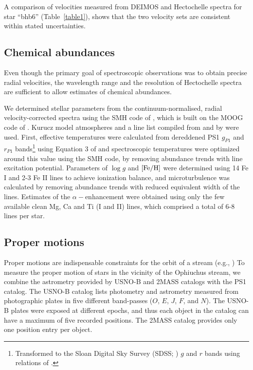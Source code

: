 \documentclass[iop]{emulateapj}
\begin{document}
A comparison of velocities measured from DEIMOS and Hectochelle spectra for star
``bhb6'' (Table~\ref{table1}), shows that the two velocity sets are consistent
within stated uncertainties.

\subsection{Chemical abundances}

Even though the primary goal of spectroscopic observations was to obtain precise
radial velocities, the wavelength range and the resolution of Hectochelle
spectra are sufficient to allow estimates of chemical abundances.

We determined stellar parameters from the continuum-normalised, radial
velocity-corrected spectra using the SMH code of \citet{cas14}, which is built
on the MOOG code of \citet{sne73}. Kurucz model atmospheres \citep{ck04} and a
line list compiled from \citet{fre10} and \citet{yon05} by \citet{cas14} were
used. First, effective temperatures were calculated from dereddened PS1 $g_{P1}$
and $r_{P1}$ bands\footnote{Transformed to the Sloan Digital Sky Survey (SDSS;
\citealt{yor00}) $g$ and $r$ bands using relations of \citet{ton12}.} using
Equation 3 of \citet{ive08} and spectroscopic temperatures were optimized around
this value using the SMH code, by removing abundance trends with line excitation
potential. Parameters of $\log g$ and ${\rm [Fe/H]}$ were determined using 14 Fe
I and 2-3 Fe II lines to achieve ionization balance, and microturbulence was
calculated by removing abundance trends with reduced equivalent width of the
lines. Estimates of the $\alpha-$enhancement were obtained using only the few
available clean Mg, Ca and Ti (I and II) lines, which comprised a total of 6-8
lines per star.

\subsection{Proper motions}

Proper motions are indispensable constraints for the orbit of a stream (e.g.,
\citealt{kop10}) To measure the proper motion of stars in the vicinity of the
Ophiuchus stream, we combine the astrometry provided by USNO-B \citep{mon03} and
2MASS \citep{skr06} catalogs with the PS1 catalog. The USNO-B catalog lists
photometry and astrometry measured from photographic plates in five different
band-passes ($O$, $E$, $J$, $F$, and $N$). The USNO-B plates were exposed at
different epochs, and thus each object in the catalog can have a maximum of five
recorded positions. The 2MASS catalog provides only one position entry per
object.
\end{document}
